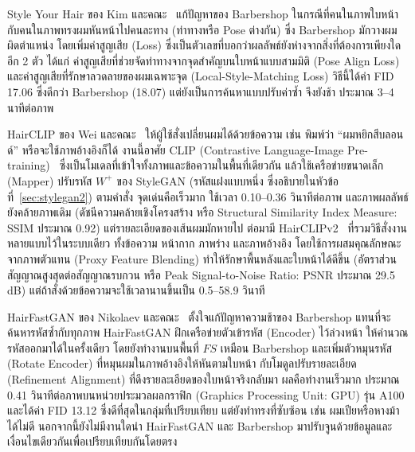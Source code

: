 Style Your Hair ของ Kim และคณะ~\cite{kim2022stylehairlatentoptimization} แก้ปัญหาของ Barbershop
ในกรณีที่คนในภาพใบหน้ากับคนในภาพทรงผมหันหน้าไปคนละทาง (ท่าทางหรือ Pose ต่างกัน) ซึ่ง Barbershop มักวางผมผิดตำแหน่ง
โดยเพิ่มค่าสูญเสีย (Loss) ซึ่งเป็นตัวเลขที่บอกว่าผลลัพธ์ยังห่างจากสิ่งที่ต้องการเพียงใด อีก 2 ตัว
ได้แก่ ค่าสูญเสียที่ช่วยจัดท่าทางจากจุดสำคัญบนใบหน้าแบบสามมิติ (Pose Align Loss)
และค่าสูญเสียที่รักษาลวดลายของผมเฉพาะจุด (Local-Style-Matching Loss)
วิธีนี้ได้ค่า FID 17.06 ซึ่งดีกว่า Barbershop (18.07) แต่ยังเป็นการค้นหาแบบปรับค่าซ้ำ จึงยังช้า ประมาณ 3--4 นาทีต่อภาพ

HairCLIP ของ Wei และคณะ~\cite{wei2022hairclipdesignhairtext} ให้ผู้ใช้สั่งเปลี่ยนผมได้ด้วยข้อความ
เช่น พิมพ์ว่า ``ผมหยิกสีบลอนด์'' หรือจะใช้ภาพอ้างอิงก็ได้
งานนี้อาศัย CLIP (Contrastive Language-Image Pre-training)~\cite{radford2021learningtransferablevisualmodels}
ซึ่งเป็นโมเดลที่เข้าใจทั้งภาพและข้อความในพื้นที่เดียวกัน แล้วใช้เครือข่ายขนาดเล็ก (Mapper)
ปรับรหัส $W^{+}$ ของ StyleGAN (รหัสแฝงแบบหนึ่ง ซึ่งอธิบายในหัวข้อที่~\ref{sec:stylegan2}) ตามคำสั่ง
จุดเด่นคือเร็วมาก ใช้เวลา 0.10--0.36 วินาทีต่อภาพ
และภาพผลลัพธ์ยังคล้ายภาพเดิม (ดัชนีความคล้ายเชิงโครงสร้าง หรือ Structural Similarity Index Measure: SSIM ประมาณ 0.92)
แต่รายละเอียดของเส้นผมมักหายไป
ต่อมามี HairCLIPv2~\cite{wei2023hairclipv2unifyinghairediting} ที่รวมวิธีสั่งงานหลายแบบไว้ในระบบเดียว
ทั้งข้อความ หน้ากาก ภาพร่าง และภาพอ้างอิง โดยใช้การผสมคุณลักษณะจากภาพตัวแทน (Proxy Feature Blending)
ทำให้รักษาพื้นหลังและใบหน้าได้ดีขึ้น (อัตราส่วนสัญญาณสูงสุดต่อสัญญาณรบกวน หรือ Peak Signal-to-Noise Ratio: PSNR ประมาณ 29.5 dB)
แต่ถ้าสั่งด้วยข้อความจะใช้เวลานานขึ้นเป็น 0.5--58.9 วินาที

HairFastGAN ของ Nikolaev และคณะ~\cite{nikolaev2024hairfastganrealisticrobusthair} ตั้งใจแก้ปัญหาความช้าของ Barbershop
แทนที่จะค้นหารหัสซ้ำกับทุกภาพ HairFastGAN ฝึกเครือข่ายตัวเข้ารหัส (Encoder) ไว้ล่วงหน้า ให้คำนวณรหัสออกมาได้ในครั้งเดียว
โดยยังทำงานบนพื้นที่ $FS$ เหมือน Barbershop และเพิ่มตัวหมุนรหัส (Rotate Encoder)
ที่หมุนผมในภาพอ้างอิงให้หันตามใบหน้า กับโมดูลปรับรายละเอียด (Refinement Alignment)
ที่ดึงรายละเอียดของใบหน้าจริงกลับมา ผลคือทำงานเร็วมาก ประมาณ 0.41 วินาทีต่อภาพบนหน่วยประมวลผลกราฟิก
(Graphics Processing Unit: GPU) รุ่น A100 และได้ค่า FID 13.12 ซึ่งดีที่สุดในกลุ่มที่เปรียบเทียบ
แต่ยังทำทรงที่ซับซ้อน เช่น ผมเปียหรือหางม้า ได้ไม่ดี
นอกจากนี้ยังไม่มีงานใดนำ HairFastGAN และ Barbershop มาปรับจูนด้วยข้อมูลและเงื่อนไขเดียวกันเพื่อเปรียบเทียบกันโดยตรง

